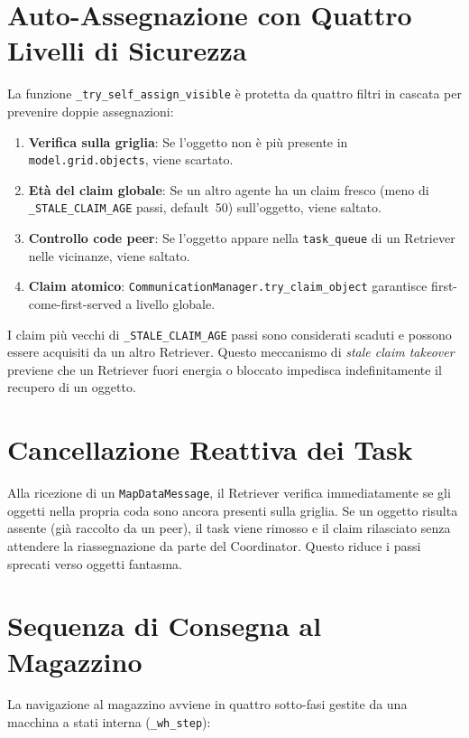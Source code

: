 \section{Auto-Assegnazione con Quattro Livelli di Sicurezza}

La funzione \texttt{\_try\_self\_assign\_visible} \`e protetta da quattro filtri
in cascata per prevenire doppie assegnazioni:

\begin{enumerate}
    \item \textbf{Verifica sulla griglia}: Se l'oggetto non \`e pi\`u presente in
          \texttt{model.grid.objects}, viene scartato.
    \item \textbf{Et\`a del claim globale}: Se un altro agente ha un claim fresco
          (meno di \texttt{\_STALE\_CLAIM\_AGE} passi, default~50) sull'oggetto,
          viene saltato.
    \item \textbf{Controllo code peer}: Se l'oggetto appare nella \texttt{task\_queue}
          di un Retriever nelle vicinanze, viene saltato.
    \item \textbf{Claim atomico}: \texttt{CommunicationManager.try\_claim\_object}
          garantisce first-come-first-served a livello globale.
\end{enumerate}

I claim pi\`u vecchi di \texttt{\_STALE\_CLAIM\_AGE} passi sono considerati scaduti e
possono essere acquisiti da un altro Retriever. Questo meccanismo di \textit{stale claim
takeover} previene che un Retriever fuori energia o bloccato impedisca indefinitamente il
recupero di un oggetto.

\section{Cancellazione Reattiva dei Task}

Alla ricezione di un \texttt{MapDataMessage}, il Retriever verifica immediatamente
se gli oggetti nella propria coda sono ancora presenti sulla griglia. Se un oggetto
risulta assente (già raccolto da un peer), il task viene rimosso e il claim rilasciato
senza attendere la riassegnazione da parte del Coordinator. Questo riduce i passi
sprecati verso oggetti fantasma.

\section{Sequenza di Consegna al Magazzino}

La navigazione al magazzino avviene in quattro sotto-fasi gestite da una macchina a stati
interna (\texttt{\_wh\_step}):

